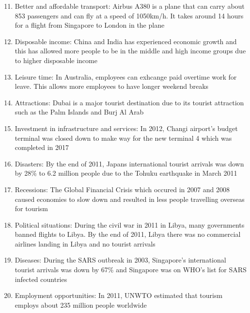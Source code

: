 \documentclass[oneside]{book}
\begin{document}
\begin{minipage}{0.5\textwidth}
  \begin{enumerate}
    \setcounter{enumi}{10}
    \item Better and affordable transport: Airbus A380 is a plane that can carry about 853 passengers and can fly at a speed of 1050km/h. It takes around 14 hours for a flight from Singapore to London in the plane
    
    \item Disposable income: China and India has experienced economic growth and this has allowed more people to be in the middle and high income groups due to higher disposable income
    
    \item Leisure time: In Australia, employees can exhcange paid overtime work for leave. This allows more employees to have longer weekend breaks
    
    \item Attractions: Dubai is a major tourist destination due to its tourist attraction such as the Palm Islands and Burj Al Arab
    
    \item Investment in infrastructure and services: In 2012, Changi airport’s budget terminal was closed down to make way for the new terminal 4 which was completed in 2017
    
    \item Disasters: By the end of 2011, Japans international tourist arrivals was down by 28\% to 6.2 million people due to the Tohuku earthquake in March 2011
    
    \item Recessions: The Global Financial Crisis which occured in 2007 and 2008 caused economies to slow down and resulted in less people travelling overseas for tourism
    
    \item Political situations: During the civil war in 2011 in Libya, many governments banned flights to Libya. By the end of 2011, Libya there was no commercial airlines landing in Libya and no tourist arrivals
    
    \item Diseases: During the SARS outbreak in 2003, Singapore’s international tourist arrivals was down by 67\% and Singapore was on WHO’s list for SARS infected countries
    
    \item Employment opportunities: In 2011, UNWTO estimated that tourism employs about 235 million people worldwide
  \end{enumerate}
\end{minipage}
\end{document}
